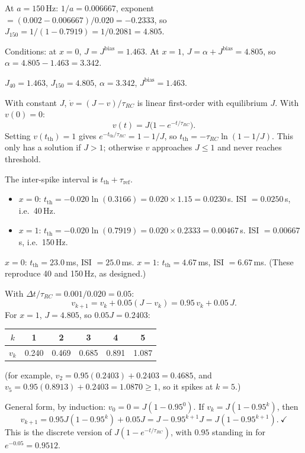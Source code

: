 \documentclass[10pt,letterpaper]{article}
\newcommand{\Jb}{J^{\mathrm{bias}}}
\newcommand{\tref}{\tau_{\mathrm{ref}}}
\newcommand{\trc}{\tau_{RC}}
\newcommand{\ans}[1]{\par\vspace{3pt}{\bfseries #1}\quad}
\begin{document}
At $a = 150$\,Hz: $1/a = 0.006667$, exponent $= (0.002 - 0.006667)/0.020 = -0.2333$, so
$J_{150} = 1/(1 - 0.7919) = 1/0.2081 = 4.805$.

Conditions: at $x = 0$, $J = \Jb = 1.463$. At $x = 1$, $J = \alpha + \Jb = 4.805$, so $\alpha = 4.805 - 1.463 = 3.342$.
\begin{result}
$J_{40} = 1.463$, $J_{150} = 4.805$, $\alpha = 3.342$, $\Jb = 1.463$.
\end{result}

\ans{2b.}
With constant $J$, $\dot v = (J - v)/\trc$ is linear first-order with equilibrium $J$. With $v(0) = 0$:
\[
v(t) = J\big(1 - e^{-t/\trc}\big).
\]
Setting $v(t_{\mathrm{th}}) = 1$ gives $e^{-t_{\mathrm{th}}/\trc} = 1 - 1/J$, so $t_{\mathrm{th}} = -\trc\ln(1 - 1/J)$. This only has a solution if $J > 1$; otherwise $v$ approaches $J \le 1$ and never reaches threshold.

The inter-spike interval is $t_{\mathrm{th}} + \tref$.
\begin{itemize}[leftmargin=1.5em,itemsep=1pt]
\item $x = 0$: $t_{\mathrm{th}} = -0.020\ln(0.3166) = 0.020 \times 1.15 = 0.0230$\,s. ISI $= 0.0250$\,s, i.e.\ 40\,Hz.
\item $x = 1$: $t_{\mathrm{th}} = -0.020\ln(0.7919) = 0.020 \times 0.2333 = 0.00467$\,s. ISI $= 0.00667$\,s, i.e.\ 150\,Hz.
\end{itemize}
\begin{result}
$x = 0$: $t_{\mathrm{th}} = 23.0$\,ms, ISI $= 25.0$\,ms. \quad $x = 1$: $t_{\mathrm{th}} = 4.67$\,ms, ISI $= 6.67$\,ms. (These reproduce 40 and 150\,Hz, as designed.)
\end{result}

\ans{2c.}
With $\Delta t/\trc = 0.001/0.020 = 0.05$:
\[
v_{k+1} = v_k + 0.05(J - v_k) = 0.95\,v_k + 0.05\,J.
\]
For $x = 1$, $J = 4.805$, so $0.05J = 0.2403$:

\begin{center}
\begin{tabular}{cccccc}
\toprule
$k$ & 1 & 2 & 3 & 4 & 5 \\
\midrule
$v_k$ & 0.240 & 0.469 & 0.685 & 0.891 & 1.087 \\
\bottomrule
\end{tabular}
\end{center}
(for example, $v_2 = 0.95(0.2403) + 0.2403 = 0.4685$, and $v_5 = 0.95(0.8913) + 0.2403 = 1.0870 \ge 1$, so it spikes at $k = 5$.)

General form, by induction: $v_0 = 0 = J(1 - 0.95^0)$. If $v_k = J(1 - 0.95^k)$, then
\[
v_{k+1} = 0.95J(1 - 0.95^k) + 0.05J = J - 0.95^{k+1}J = J(1 - 0.95^{k+1}).\ \checkmark
\]
This is the discrete version of $J(1 - e^{-t/\trc})$, with $0.95$ standing in for $e^{-0.05} = 0.9512$.
\end{document}
